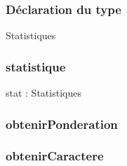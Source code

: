 \subsubsection{Déclaration du type}

\begin{algorithme}
    \begin{enregistrement}{Statistiques}
    \end{enregistrement}    
\end{algorithme}

\subsubsection{statistique}

\begin{algorithme}
        {stat : Statistiques}
        {
        }
\end{algorithme}

\subsubsection{obtenirPonderation}

\begin{algorithme}
        {}
        {}
\end{algorithme}

\subsubsection{obtenirCaractere}

\begin{algorithme}
        {}
        {}
\end{algorithme}